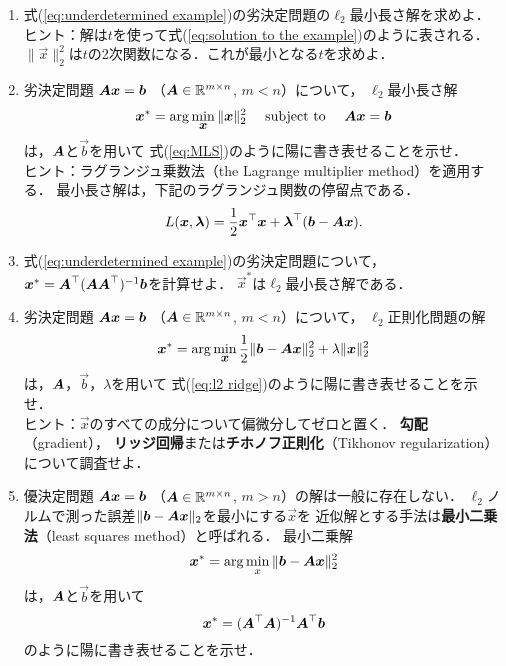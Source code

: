 \begin{enumerate}

\item
式(\ref{eq:underdetermined example})の劣決定問題の$\ell_2$最小長さ解を求めよ．\\
ヒント：解は$t$を使って式(\ref{eq:solution to the example})のように表される．
$\|\vec x\|_2^2$は$t$の2次関数になる．これが最小となる$t$を求めよ．

\item\yeeks\label{ex:min l2 solution}
劣決定問題
$\mbox{\boldmath $A$}\mbox{\boldmath $x$}=\mbox{\boldmath $b$}$
（$\mbox{\boldmath $A$}\in\mathbb{R}^{m\times n}$, $m<n$）について，
$\ell_2$最小長さ解
\begin{equation}
 \mbox{\boldmath $x$}^*=\arg\min_{\small\mbox{\boldmath $x$}}\|\mbox{\boldmath $x$}\|_2^2\quad\mbox{ subject to }\quad \mbox{\boldmath $A$}\mbox{\boldmath $x$}=\mbox{\boldmath $b$}
\end{equation}
は，$\mbox{\boldmath $A$}$と$\vec b$を用いて
式(\ref{eq:MLS})のように陽に書き表せることを示せ．\\
ヒント：ラグランジュ乗数法（the Lagrange multiplier method）を適用する．
最小長さ解は，下記のラグランジュ関数の停留点である．
\[
 L(\mbox{\boldmath $x$},\mbox{\boldmath $\lambda$})=\frac{1}{2}\mbox{\boldmath $x$}^\top\mbox{\boldmath $x$}+\mbox{\boldmath $\lambda$}^\top(\mbox{\boldmath $b$}-\mbox{\boldmath $A$}\mbox{\boldmath $x$}).
\]

\item
式(\ref{eq:underdetermined example})の劣決定問題について，
$\mbox{\boldmath $x$}^*=\mbox{\boldmath $A$}^\top(\mbox{\boldmath $A$}\mbox{\boldmath $A$}^\top)^{-1}\mbox{\boldmath $b$}$を計算せよ．
$\vec x^*$は$\ell_2$最小長さ解である．


\item\yeeks\label{ex:l2 regularization}
劣決定問題
$\mbox{\boldmath $A$}\mbox{\boldmath $x$}=\mbox{\boldmath $b$}$
（$\mbox{\boldmath $A$}\in\mathbb{R}^{m\times n}$, $m<n$）について，
$\ell_2$正則化問題の解
\begin{equation}
 \mbox{\boldmath $x$}^*=\arg\min_{\small\mbox{\boldmath $x$}} \frac{1}{2}\|\mbox{\boldmath $b$}-\mbox{\boldmath $A$}\mbox{\boldmath $x$}\|_2^2+\lambda \|\mbox{\boldmath $x$}\|_2^2
\end{equation}
は，$\mbox{\boldmath $A$}$，$\vec b$，$\lambda$を用いて
式(\ref{eq:l2 ridge})のように陽に書き表せることを示せ．\\
ヒント：$\vec x$のすべての成分について偏微分してゼロと置く．
{\bf 勾配}（gradient），
{\bf リッジ回帰}または{\bf チホノフ正則化}（Tikhonov regularization）について調査せよ．

\item\yeeks\label{ex:least squares}
優決定問題
$\mbox{\boldmath $A$}\mbox{\boldmath $x$}=\mbox{\boldmath $b$}$
（$\mbox{\boldmath $A$}\in\mathbb{R}^{m\times n}$, $m>n$）の解は一般に存在しない．
$\ell_2$ノルムで測った誤差$\|\mbox{\boldmath $b$}-\mbox{\boldmath $A$}\mbox{\boldmath $x$}\|_2$を最小にする$\vec x$を
近似解とする手法は{\bf 最小二乗法}（least squares method）と呼ばれる．
最小二乗解
\begin{equation}
 \mbox{\boldmath $x$}^*=\arg\min_x\|\mbox{\boldmath $b$}-\mbox{\boldmath $A$}\mbox{\boldmath $x$}\|_2^2
\end{equation}
は，$\mbox{\boldmath $A$}$と$\vec b$を用いて
\begin{equation}
 \mbox{\boldmath $x$}^*=(\mbox{\boldmath $A$}^\top\mbox{\boldmath $A$})^{-1}\mbox{\boldmath $A$}^\top\mbox{\boldmath $b$}
\end{equation}
のように陽に書き表せることを示せ．



\end{enumerate}

